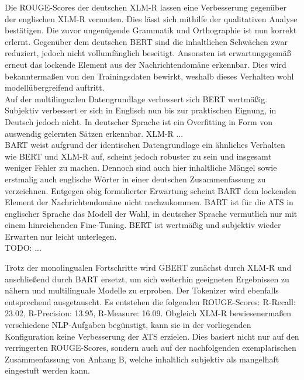 \noindent
Die \ac{ROUGE}-Scores der deutschen \ac{XLM-R} lassen eine Verbesserung gegenüber der englischen \ac{XLM-R} vermuten. Dies lässt sich mithilfe der qualitativen Analyse bestätigen. Die zuvor ungenügende Grammatik und Orthographie ist nun korrekt erlernt. Gegenüber dem deutschen \ac{BERT} sind die inhaltlichen Schwächen zwar reduziert, jedoch nicht vollumfänglich beseitigt. Ansonsten ist erwartungsgemäß erneut das lockende Element aus der Nachrichtendomäne erkennbar. Dies wird bekanntermaßen von den Trainingsdaten bewirkt, weshalb dieses Verhalten wohl modellübergreifend auftritt.\\

\noindent
Auf der multilingualen Datengrundlage verbessert sich \ac{BERT} wertmäßig. Subjektiv verbessert er sich in Englisch nun bis zur praktischen Eignung, in Deutsch jedoch nicht. In deutscher Sprache ist ein Overfitting in Form von auswendig gelernten Sätzen erkennbar. \ac{XLM-R} ...\\ %

\noindent
\ac{BART} weist aufgrund der identischen Datengrundlage ein ähnliches Verhalten wie \ac{BERT} und \ac{XLM-R} auf, scheint jedoch robuster zu sein und insgesamt weniger Fehler zu machen. Dennoch sind auch hier inhaltliche Mängel sowie erstmalig auch englische Wörter in einer deutschen Zusammenfassung zu verzeichnen. Entgegen obig formulierter Erwartung scheint \ac{BART} dem lockenden Element der Nachrichtendomäne nicht nachzukommen. \ac{BART} ist für die \ac{ATS} in englischer Sprache das Modell der Wahl, in deutscher Sprache vermutlich nur mit einem hinreichenden Fine-Tuning. \ac{BERT} ist wertmäßig und subjektiv wieder Erwarten nur leicht unterlegen.\\

\noindent
TODO: ...



\noindent
Trotz der monolingualen Fortschritte wird \ac{GBERT} zunächst durch \ac{XLM-R} und anschließend durch \ac{BART} ersetzt, um sich weiterhin geeigneten Ergebnissen zu nähern und multilinguale Modelle zu erproben. Der Tokenizer wird ebenfalls entsprechend ausgetauscht. Es entstehen die folgenden \ac{ROUGE}-Scores: R-Recall: 23.02, R-Precision: 13.95, R-Measure: 16.09. Obgleich \ac{XLM-R} bewiesenermaßen verschiedene \ac{NLP}-Aufgaben begünstigt, kann sie in der vorliegenden Konfiguration keine Verbesserung der \ac{ATS} erzielen. Dies basiert nicht nur auf den verringerten \ac{ROUGE}-Scores, sondern auch auf der nachfolgenden exemplarischen Zusammenfassung von Anhang B, welche inhaltlich subjektiv als mangelhaft eingestuft werden kann.\\

